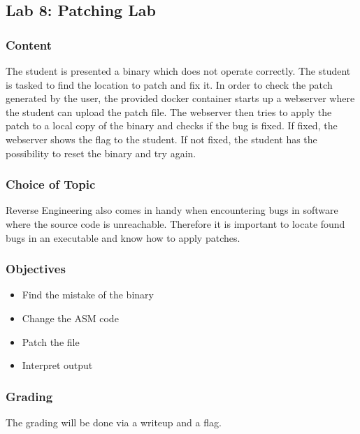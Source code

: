 \subsection{Lab 8: Patching Lab}
\subsubsection*{Content}
The student is presented a binary which does not operate correctly. The student is tasked to find the location to patch and fix it. In order to check the patch generated by the user, the provided docker container starts up a webserver where the student can upload the patch file. The webserver then tries to apply the patch to a local copy of the binary and checks if the bug is fixed. If fixed, the webserver shows the flag to the student. If not fixed, the student has the possibility to reset the binary and try again.

\subsubsection*{Choice of Topic}
Reverse Engineering also comes in handy when encountering bugs in software where the source code is unreachable. Therefore it is important to locate found bugs in an executable and know how to apply patches.
\subsubsection*{Objectives}
\begin{itemize}
    \item Find the mistake of the binary
    \item Change the ASM code
    \item Patch the file
    \item Interpret output
\end{itemize}
\subsubsection*{Grading}
The grading will be done via a writeup and a flag.
